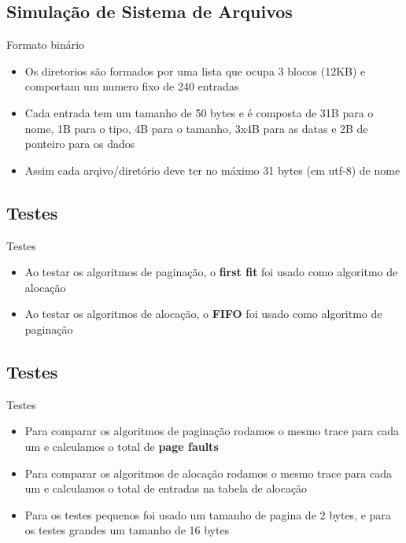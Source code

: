 \documentclass{beamer}
\begin{document}
\subsection{Simulação de Sistema de Arquivos}
\begin{frame}{Formato binário}
\begin{itemize}
\setlength\itemsep{1em}
\item Os diretorios são formados por uma lista que ocupa 3 blocos (12KB) e comportam um numero fixo de 240 entradas
\item Cada entrada tem um tamanho de 50 bytes e é composta de 31B para o nome, 1B para o tipo, 4B para o tamanho, 3x4B para as datas e 2B de ponteiro para os dados
\item Assim cada arqivo/diretório deve ter no máximo 31 bytes (em utf-8) de nome
\end{itemize}
\end{frame}


\iffalse
\subsection{Testes}
\begin{frame}{Testes}
\begin{itemize}
\setlength\itemsep{1em}
\item Ao testar os algoritmos de paginação, o {\bf first fit} foi usado como algoritmo de alocação
\item Ao testar os algoritmos de alocação, o {\bf FIFO} foi usado como algoritmo de paginação
\end{itemize}
\end{frame}


\subsection{Testes}
\begin{frame}{Testes}
\begin{itemize}
\setlength\itemsep{1em}
\item Para comparar os algoritmos de paginação rodamos o mesmo trace para cada um e calculamos o total de {\bf page faults}
\item Para comparar os algoritmos de alocação rodamos o mesmo trace para cada um e calculamos o total de entradas na tabela de alocação
\item Para os testes pequenos foi usado um tamanho de pagina de 2 bytes, e para os testes grandes um tamanho de 16 bytes
\end{itemize}
\end{frame}
\end{document}
